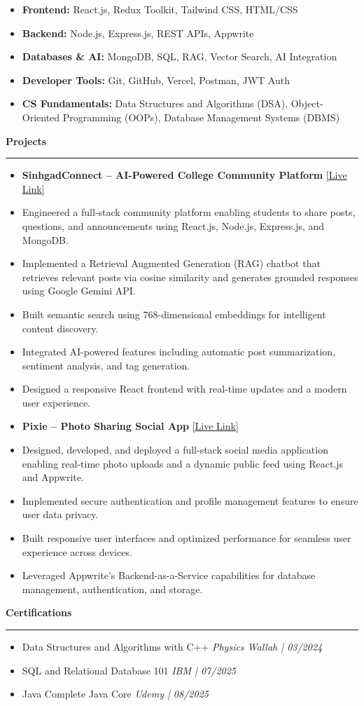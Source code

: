 \documentclass[a4paper,11pt]{article}
\newcommand{\sectionTitle}[1]{
    \par\vspace{12pt}
    \Needspace{3\baselineskip}
    \noindent\textbf{\large #1}
    \par\vspace{2pt}\hrule\vspace{6pt}
}
\newcommand{\projectEntry}[2]{
    \begin{itemize}[leftmargin=*, label={}]
        \item \textbf{#1} \hfill \href{#2}{\small{[Live Link]}}
    \end{itemize}
}
\newcommand{\descriptionItem}[1]{
    \begin{itemize}[leftmargin=2em, itemsep=4pt, topsep=4pt]
        \item #1
    \end{itemize}
}
\newcommand{\skillList}[2]{
    \begin{itemize}[leftmargin=*, label={}]
        \item \textbf{#1:} #2
    \end{itemize}
}
\newcommand{\certificationEntry}[2]{
     \begin{itemize}[leftmargin=*, label={}]
        \item #1 \hfill \textit{#2}
     \end{itemize}
}
\begin{document}
\skillList{Frontend}{React.js, Redux Toolkit, Tailwind CSS, HTML/CSS}

\skillList{Backend}{Node.js, Express.js, REST APIs, Appwrite}

\skillList{Databases \& AI}{MongoDB, SQL, RAG, Vector Search, AI Integration}

\skillList{Developer Tools}{Git, GitHub, Vercel, Postman, JWT Auth}

\skillList{CS Fundamentals}{Data Structures and Algorithms (DSA), Object-Oriented Programming (OOPs), Database Management Systems (DBMS)}

\sectionTitle{Projects}

\projectEntry
{SinhgadConnect -- AI-Powered College Community Platform}
{https://premkumar324.github.io/projects/index.html}

\descriptionItem{Engineered a full-stack community platform enabling students to share posts, questions, and announcements using React.js, Node.js, Express.js, and MongoDB.}

\descriptionItem{Implemented a Retrieval Augmented Generation (RAG) chatbot that retrieves relevant posts via cosine similarity and generates grounded responses using Google Gemini API.}

\descriptionItem{Built semantic search using 768-dimensional embeddings for intelligent content discovery.}

\descriptionItem{Integrated AI-powered features including automatic post summarization, sentiment analysis, and tag generation.}

\descriptionItem{Designed a responsive React frontend with real-time updates and a modern user experience.}

\projectEntry
{Pixie -- Photo Sharing Social App}
{https://pixie-photo-sharing-app.vercel.app/}

\descriptionItem{Designed, developed, and deployed a full-stack social media application enabling real-time photo uploads and a dynamic public feed using React.js and Appwrite.}

\descriptionItem{Implemented secure authentication and profile management features to ensure user data privacy.}

\descriptionItem{Built responsive user interfaces and optimized performance for seamless user experience across devices.}

\descriptionItem{Leveraged Appwrite's Backend-as-a-Service capabilities for database management, authentication, and storage.}

\sectionTitle{Certifications}

\certificationEntry
{Data Structures and Algorithms with C++}
{Physics Wallah | 03/2024}

\certificationEntry
{SQL and Relational Database 101}
{IBM | 07/2025}

\certificationEntry
{Java Complete Java Core}
{Udemy | 08/2025}
\end{document}
